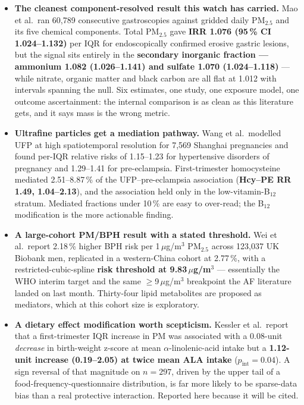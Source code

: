 \documentclass[10pt]{article}
\begin{document}
\footnotesize
\begin{itemize}\itemsep2pt
\item \textbf{The cleanest component-resolved result this watch has carried.}
Mao et al.\ ran 60,789 consecutive gastroscopies against gridded daily PM$_{2.5}$ and its
five chemical components. Total PM$_{2.5}$ gave \textbf{IRR 1.076 (95\,\% CI
1.024--1.132)} per IQR for endoscopically confirmed erosive gastric lesions, but the
signal sits entirely in the \textbf{secondary inorganic fraction --- ammonium 1.082
(1.026--1.141) and sulfate 1.070 (1.024--1.118)} --- while nitrate, organic matter and
black carbon are all flat at 1.012 with intervals spanning the null. Six estimates, one
study, one exposure model, one outcome ascertainment: the internal comparison is as
clean as this literature gets, and it says mass is the wrong metric.

\item \textbf{Ultrafine particles get a mediation pathway.} Wang et al.\ modelled UFP at
high spatiotemporal resolution for 7,569 Shanghai pregnancies and found per-IQR relative
risks of 1.15--1.23 for hypertensive disorders of pregnancy and 1.29--1.41 for
pre-eclampsia. First-trimester homocysteine mediated 2.51--8.87\,\% of the UFP--pre-eclampsia
association (\textbf{Hcy--PE RR 1.49, 1.04--2.13}), and the association held only in the
low-vitamin-B$_{12}$ stratum. Mediated fractions under 10\,\% are easy to over-read;
the B$_{12}$ modification is the more actionable finding.

\item \textbf{A large-cohort PM/BPH result with a stated threshold.} Wei et al.\ report
2.18\,\% higher BPH risk per 1\,$\mu$g/m$^3$ PM$_{2.5}$ across 123,037 UK Biobank men,
replicated in a western-China cohort at 2.77\,\%, with a restricted-cubic-spline
\textbf{risk threshold at 9.83\,$\mu$g/m$^3$} --- essentially the WHO interim target and
the same $\ge$9\,$\mu$g/m$^3$ breakpoint the AF literature landed on last month. Thirty-four
lipid metabolites are proposed as mediators, which at this cohort size is exploratory.

\item \textbf{A dietary effect modification worth scepticism.} Kessler et al.\ report
that a first-trimester IQR increase in PM was associated with a 0.08-unit
\emph{decrease} in birth-weight z-score at mean $\alpha$-linolenic-acid intake but a
\textbf{1.12-unit increase (0.19--2.05) at twice mean ALA intake} ($p_{\mathrm{int}}=0.04$).
A sign reversal of that magnitude on $n=297$, driven by the upper tail of a
food-frequency-questionnaire distribution, is far more likely to be sparse-data bias than
a real protective interaction. Reported here because it will be cited.


\end{itemize}
\end{document}
